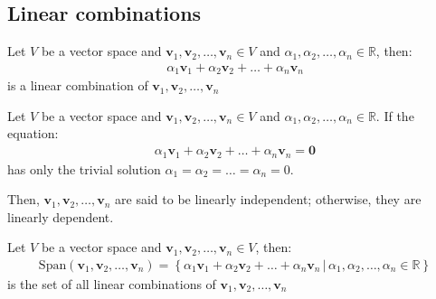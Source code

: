\documentclass[11pt]{article}
\begin{document}
\subsection{Linear combinations}
\begin{definition}
    Let $V$ be a vector space and $\textbf{v}_1, \textbf{v}_2, \ldots, \textbf{v}_n \in V$ and $\alpha_1, \alpha_2, \ldots, \alpha_n \in \mathbb{R}$, then:
    \begin{align*}
        \alpha_1 \textbf{v}_1 + \alpha_2 \textbf{v}_2 + \ldots + \alpha_n \textbf{v}_n
    \end{align*}
    is a linear combination of $\textbf{v}_1, \textbf{v}_2, \ldots, \textbf{v}_n$
\end{definition}
\begin{definition}
    Let $V$ be a vector space and $\textbf{v}_1, \textbf{v}_2, \ldots, \textbf{v}_n \in V$ and $\alpha_1, \alpha_2, \ldots, \alpha_n \in \mathbb{R}$. If the equation:
    \begin{align*}
        \alpha_1 \textbf{v}_1 + \alpha_2 \textbf{v}_2 + \ldots + \alpha_n \textbf{v}_n = \textbf{0}
    \end{align*}
    has only the trivial solution $\alpha_1 = \alpha_2 = \ldots = \alpha_n = 0$.

    Then, $\textbf{v}_1, \textbf{v}_2, \ldots, \textbf{v}_n$ are said to be linearly independent; otherwise, they are linearly dependent.
\end{definition}
\begin{definition}[Span]
    Let $V$ be a vector space and $\textbf{v}_1, \textbf{v}_2, \ldots, \textbf{v}_n \in V$, then:
    \begin{align*}
        \text{Span}(\textbf{v}_1, \textbf{v}_2, \ldots, \textbf{v}_n) = \left\{ \alpha_1 \textbf{v}_1 + \alpha_2 \textbf{v}_2 + \ldots + \alpha_n \textbf{v}_n \, | \, \alpha_1, \alpha_2, \ldots, \alpha_n \in \mathbb{R} \right\}
    \end{align*}
    is the set of all linear combinations of $\textbf{v}_1, \textbf{v}_2, \ldots, \textbf{v}_n$
\end{definition}
\end{document}
